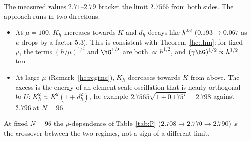 The measured values $2.71$--$2.79$ bracket the limit $2.7565$ from both sides. The approach runs in two directions.
\begin{itemize}
\item At $\mu=100$, $K_h$ increases towards $K$ and $d_h$ decays like $h^{0.6}$ ($0.193\to0.067$ as $h$ drops by a factor $5.3$).
This is consistent with Theorem~\ref{hc:thm}: for fixed $\mu$, the terms $(h/\mu)^{1/2}$ and $\hG^{1/2}$ are both
$\propto h^{1/2}$, and $(\gamma\hG)^{1/2}\propto h^{1/2}$ too.
\item At large $\mu$ (Remark~\ref{hc:regime}), $K_h$ decreases towards $K$ from above. The excess is the energy of an
element-scale oscillation that is nearly orthogonal to $U$: $K_h^2\approx K^2(1+d_h^2)$, for example $2.7565\sqrt{1+0.175^2}=2.798$
against $2.796$ at $N=96$.
\end{itemize}
At fixed $N=96$ the $\mu$-dependence of Table~\ref{tab:P} ($2.708\to2.770\to2.790$) is the crossover between the two regimes,
not a sign of a different limit.
